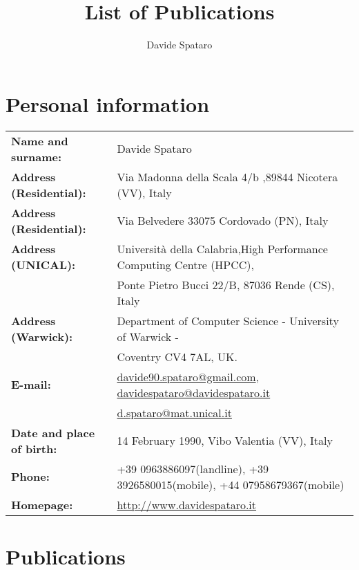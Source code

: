 \documentclass[a4paper,10pt]{article}
\title{List of Publications}
\author{Davide Spataro}
\begin{document}
\maketitle


\newpage

\section{Personal information}


\begin{table}[h]
\begin{tabular}{l l}
\textbf{Name and surname:} & Davide Spataro \\
\textbf{Address (Residential):} & Via Madonna della Scala 4/b ,89844 Nicotera
(VV), Italy \\
\textbf{Address (Residential):} & Via Belvedere 33075 Cordovado (PN), Italy
\\
\textbf{Address (UNICAL):} & Universit\`a della Calabria,High Performance
Computing Centre (HPCC),\\&  Ponte Pietro Bucci 22/B, 87036 Rende (CS),
Italy
\\
\textbf{Address (Warwick):} & Department of Computer Science -  University
of Warwick -\\
& Coventry CV4 7AL, UK.
\\
\textbf{E-mail:} &
\href{mailto:davide90.spataro@gmail.com}{davide90.spataro@gmail.com},
\href{mailto:davidespataro@davidespataro.it}{davidespataro@davidespataro.it}\\&
\href{mailto:d.spataro@mat.unical.it}{d.spataro@mat.unical.it}
\\
\textbf{Date and place of birth:} & 14 February 1990, Vibo Valentia (VV),
Italy \\
\textbf{Phone: }& +39 0963886097(landline), +39 3926580015(mobile),
+44 07958679367(mobile) \\
\textbf{Homepage: }& \url{http://www.davidespataro.it} \\
\end{tabular}
\end{table}

\begin{center}
\mbox{}
\end{center}
 


\section{Publications}
\end{document}
